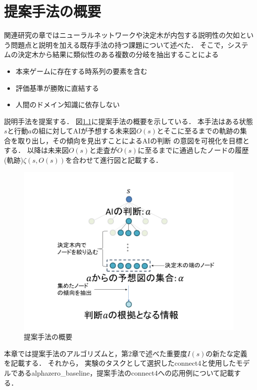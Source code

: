 \chapter{提案手法の概要}
関連研究の章ではニューラルネットワークや決定木が内包する説明性の欠如という問題点と説明を加える既存手法の持つ課題について述べた．
そこで，システムの決定木から結果に類似性のある複数の分岐を抽出することによる
\begin{itemize}
	\item 本来ゲームに存在する時系列の要素を含む
	\item 評価基準が勝敗に直結する
    \item 人間のドメイン知識に依存しない
\end{itemize}
説明手法を提案する．
図\ref{fig:mabs}に提案手法の概要を示している．
本手法はある状態$s$と行動$a$の組に対してAIが予想する未来図$O(s)$とそこに至るまでの軌跡の集合を取り出し，その傾向を見出すことによるAIの判断
の意図を可視化を目標とする．
以降は未来図$O(s)$と走査が$O(s)$に至るまでに通過したノードの履歴(軌跡)$\zeta(s, O(s))$を合わせて進行図と記載する．
\begin{figure}[t]
    \centering
    \includegraphics[width=\linewidth]{./figure/mabs.png}
    \caption{提案手法の概要}
    \label{fig:mabs}
\end{figure}
本章では提案手法のアルゴリズムと，第2章で述べた重要度$I(s)$の新たな定義を記載する．
それから，
実験のタスクとして選択したconnect4と使用したモデルであるalphazero\_baseline，提案手法のconnect4への応用例について記載する．


